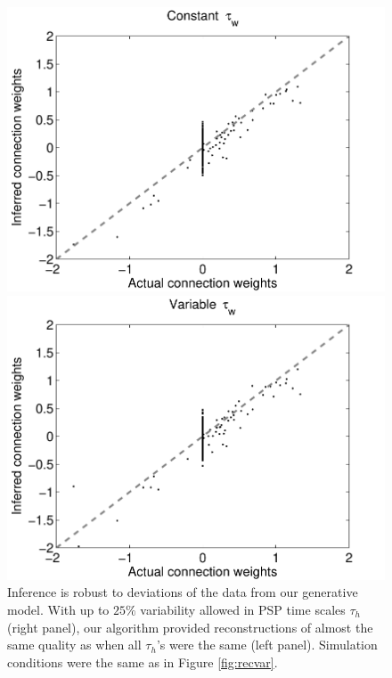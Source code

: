 \documentclass[aoas,preprint]{imsart}
\begin{document}
\begin{figure}[t!]
\centering
\begin{minipage}[c]{0.45\hsize}
\includegraphics[width=\hsize]{../figs/FigureA9_all_same_sol}
\end{minipage}
\begin{minipage}[c]{0.45\hsize}
\includegraphics[width=\hsize]{../figs/FigureA9_variable_25}
\end{minipage}
\caption{ Inference is robust to deviations of the data from our
generative model. With up to $25\%$ variability allowed in PSP time
scales $\tau_h$ (right panel), our algorithm provided reconstructions
of almost the same quality as when all $\tau_h$'s were the same (left
panel). Simulation conditions were the same as in Figure
\ref{fig:recvar}.}
\label{fig:vartau}
\end{figure}
\end{document}
